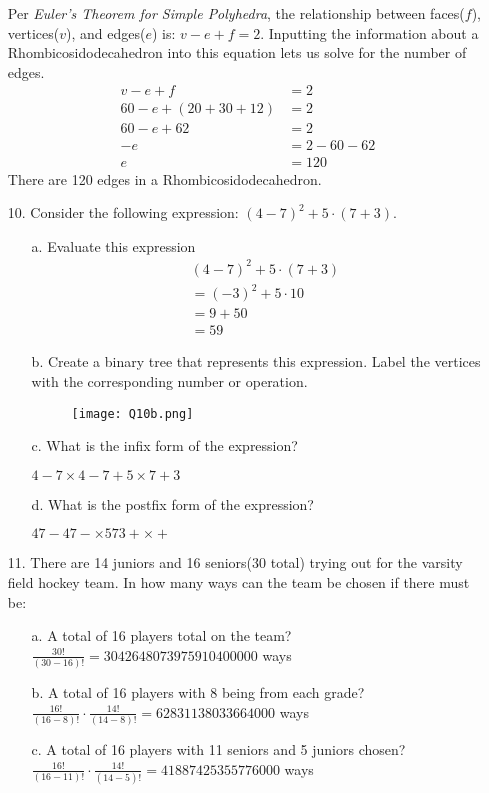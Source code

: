 \documentclass{article}
\begin{document}
\begin{itemize}
    Per \emph{Euler's Theorem for Simple Polyhedra}, the relationship between faces($f$), vertices($v$), and edges($e$) is: $v-e+f=2$. Inputting the information about a Rhombicosidodecahedron into this equation lets us solve for the number of edges.
    \begin{align}
        v-e+f&=2\nonumber\\
        60-e+(20+30+12)&=2\nonumber\\
        60-e+62&=2\nonumber\\
        -e&=2-60-62\nonumber\\
        e&=120\nonumber
    \end{align}
    {\color{blue} There are 120 edges in a Rhombicosidodecahedron.}
    \newpage
    \item[10.] Consider the following expression: $(4-7)^2+5\cdot(7+3)$.
    \begin{itemize}
        \item[a.] Evaluate this expression
        \begin{align}
            &(4-7)^2+5\cdot(7+3)\nonumber\\
            &=(-3)^2+5\cdot10\nonumber\\
            &=9+50\nonumber\\
            &=59\nonumber
        \end{align}
        \item[b.] Create a binary tree that represents this expression. Label the vertices with the corresponding number or operation.
        \begin{figure}[h]
            \centering
            \texttt{[image: Q10b.png]}
        \end{figure}
        
        \item[c.] What is the infix form of the expression?
        
        {\color{blue}$4-7\times4-7+5\times7+3$}
        \item[d.] What is the postfix form of the expression?
        
        {\color{blue}$47-47-\times573+\times+$}
    \end{itemize}
    
    \item[11.] There are 14 juniors and 16 seniors(30 total) trying out for the varsity field hockey team. In how many ways can the team be chosen if there must be:
    \begin{itemize}
        \item[a.] A total of 16 players total on the team? {\color{blue}$\frac{30!}{(30-16)!}=3042648073975910400000$ ways}
        \item[b.] A total of 16 players with 8 being from each grade? {\color{blue} $\frac{16!}{(16-8)!}\cdot\frac{14!}{(14-8)!}=62831138033664000$ ways}
        \item[c.] A total of 16 players with 11 seniors and 5 juniors chosen? {\color{blue}$\frac{16!}{(16-11)!}\cdot\frac{14!}{(14-5)!}=41887425355776000$ ways}
    \end{itemize}
    

\end{itemize}
\end{document}
